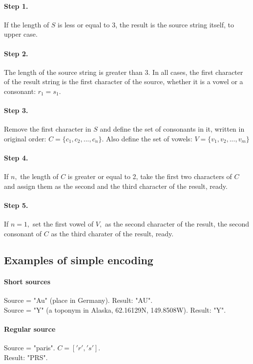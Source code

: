 \documentclass[12pt,a4paper]{article}
\begin{document}
	\paragraph{Step 1.} If the length of $S$ is less or equal to 3, the result is the source string itself, to upper case.
	
	\paragraph{Step 2.} The length of the source string is greater than 3. In all cases, the first character of the result string is the first character of the source, whether it is a vowel or a consonant: $r_1 = s_1.$
	
	\paragraph{Step 3.} Remove the first character in $S$ and define the set of consonants in it, written in original order: $C = \{ c_1, c_2, ..., c_n\}$. Also define the set of vowels: $V = \{ v_1, v_2, ..., v_m\}$

	\paragraph{Step 4.} If $n,$ the length of $C$ is greater or equal to 2, take the first two characters of $C$ and assign them as the second and the third character of the result, ready.
	
	\paragraph{Step 5.} If $n=1,$ set the first vowel of $V,$ as the second character of the result, the second consonant of $C$ as the third charater of the result, ready.
	
	\subsection{Examples of simple encoding}
	\paragraph{Short sources\\}
	Source = "Au" (place in Germany). Result: "AU".\\
	Source = "Y" (a toponym in Alaska, 62.16129N, 149.8508W). Result: "Y".
	
	\paragraph{Regular source\\}
	Source = "paris". $C= \left['r', 's'\right]. $ \\
	Result: "PRS".
	
\end{document}
